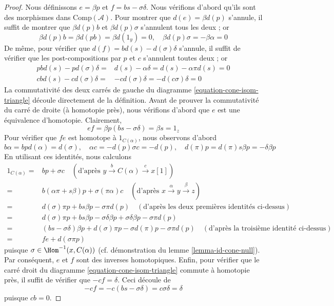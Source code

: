 \begin{proof}
\medskip\noindent
Nous définissons $e=\beta p$ et $f=bs-\sigma\delta$. Nous vérifions d'abord qu'ils
sont des morphismes dans $\text{Comp}(\mathcal{A})$. Pour montrer que $d(e)=\beta
d(p)$ s'annule, il suffit de montrer que $\beta d(p)b$ et $\beta d(p)\sigma$
s'annulent tous les deux ; or
$$
\beta d(p)b = \beta d(pb) = \beta d(1_y) = 0,\quad
\beta d(p)\sigma = -\beta\alpha = 0
$$
De même, pour vérifier que $d(f)=bd(s)-d(\sigma)\delta$ s'annule, il
suffit de vérifier que les post-compositions par $p$ et $c$ s'annulent toutes
deux ; or
\begin{align*}
pbd(s) - pd(\sigma)\delta
= &
d(s)-\alpha\delta = d(s)-\alpha\pi d(s) = 0 \\
cbd(s)-cd(\sigma)\delta =
&
-cd(\sigma)\delta = -d(c\sigma)\delta = 0
\end{align*}
La commutativité des deux carrés de gauche du
diagramme \ref{equation-cone-isom-triangle} découle directement de la définition.
Avant de prouver la commutativité du carré de droite (à homotopie près), nous
vérifions d'abord que $e$ est une équivalence d'homotopie. Clairement,
$$
ef=\beta p (bs-\sigma\delta)=\beta s=1_z
$$
Pour vérifier que $fe$ est homotope à $1_{C(\alpha)}$, nous observons d'abord
$$
b\alpha = bpd(\alpha) = d(\sigma),\quad
\alpha c = -d(p)\sigma c = -d(p),\quad
d(\pi)p = d(\pi)s\beta p = -\delta\beta p
$$
En utilisant ces identités, nous calculons
\begin{align*}
1_{C(\alpha)} = &
bp + \sigma c
\quad (\text{d'après }y \xrightarrow{b} C(\alpha) \xrightarrow{c} x[1]) \\ = &
b(\alpha\pi
+ s\beta)p + \sigma(\pi\alpha)c \quad
(\text{d'après }x \xrightarrow{\alpha} y \xrightarrow{\beta} z) \\ = &
d(\sigma)\pi
p + bs\beta p - \sigma\pi d(p) \quad
(\text{d'après les deux premières identités ci-dessus}) \\ = &
d(\sigma)\pi
p + bs\beta p - \sigma\delta\beta p +
\sigma\delta\beta p - \sigma\pi d(p) \\ = & (bs -
\sigma\delta)\beta
p + d(\sigma)\pi p - \sigma d(\pi)p -
\sigma\pi d(p)\quad (\text{d'après la
troisième identité ci-dessus}) \\ = & fe +
d(\sigma
\pi p)
\end{align*}
puisque $\sigma \in \Hom^{-1}(x, C(\alpha))$
(cf. démonstration du lemme \ref{lemma-id-cone-null}).
Par conséquent, $e$ et $f$ sont des inverses
homotopiques. Enfin, pour vérifier que le carré
droit du diagramme \ref{equation-cone-isom-triangle} commute à homotopie
près, il suffit de vérifier que $-cf=\delta$. Ceci découle de
$$
-cf = -c(bs-\sigma\delta) = c\sigma\delta = \delta
$$
puisque $cb=0$.


\end{proof}
